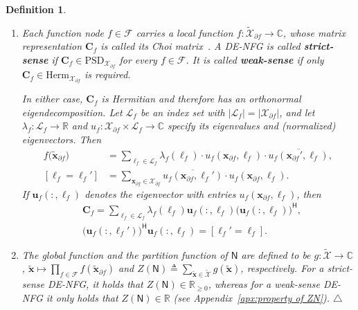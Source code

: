 \documentclass[journal]{IEEEtran}
\newcommand{\add}[1]{{\color{black}#1}}
\newtheorem{definition}[theorem]{Definition}
\newcommand{\manualendsymbol}[1]{%
  \leavevmode\unskip\penalty9999\hbox{}\nobreak\hfill
  \quad\hbox{#1}}
\newcommand{\edefinition}{\manualendsymbol{\ensuremath{\triangle}}}
\newcommand{\vect}[1]{ \bm{#1} }
\newcommand{\set}[1]{\mathcal{#1}}
\newcommand{\setF}{ \mathcal{F} }
\newcommand{\setpf}{ \partial f }
\newcommand{\sR}{\mathbb{R}}
\newcommand{\sC}{\mathbb{C}}
\newcommand{\Herm}{\mathsf{H}}
\newcommand{\vx}{ \vect{x} }
\newcommand{\graphN}{ \mathsf{N} }
\newcommand{\defeq}{ \triangleq }
\newcommand{\setHerm}[1]{ \mathrm{Herm}_{#1} }
\newcommand{\setPSD}[1]{ \mathrm{PSD}_{#1} }
\newcommand{\sRp}{ \mathbb{R}_{\geq 0} }
\newcommand{\tset}[1]{\tilde{\mathcal{#1}}}
\newcommand{\matr}[1]{\vect{#1}}
\newcommand{\tvx}{ \tilde{\vect{x}}  }
\begin{document}
\begin{definition}
\begin{enumerate}
    \item\label{sec:DENFG:def:4:item:4} \add{Each function node
            $f\in\setF$ carries a local function $f:\tset{X}_{\setpf}\to\sC$,
            whose matrix representation $\matr{C}_f$ is called its Choi
            matrix~\cite{Wood2015}. A DE-NFG is called \textbf{strict-sense}
            if} \add{$\matr{C}_f\in\setPSD{\set{X}_{\setpf}}$ for every
            $f\in\setF$. It is called \textbf{weak-sense} if only
            $\matr{C}_f\in\setHerm{\set{X}_{\setpf}}$ is required.}

          \add{In either case, $\matr{C}_f$ is Hermitian and therefore has an
            orthonormal eigendecomposition. Let $\set{L}_f$ be an index set
            with $|\set{L}_f|=|\set{X}_{\setpf}|$, and let
            $\lambda_f:\set{L}_f\to\sR$ and
            $u_f:\set{X}_{\setpf}\times\set{L}_f\to\sC$ specify its
            eigenvalues and (normalized) eigenvectors. Then}
          \begin{align}
            \!\!\!\!\! \! f\bigl(\tvx_{\setpf}\bigr)
             & =\sum_{\ell_f\in\set{L}_f}
            \lambda_f(\ell_f)
            \cdot u_f(\vx_{\setpf},\ell_f)
            \cdot  \overline{u_f(\vx_{\setpf}',\ell_f)},
            \label{sec:DENFG:eqn:5}                    \\
            \!\!\!\!\! \!  [\ell_f=\ell_f']
             & =\sum_{\vx_{\setpf}\in\set{X}_{\setpf}}
            \overline{u_f(\vx_{\setpf},\ell_f')}
            \cdot  u_f(\vx_{\setpf},\ell_f).
            \label{sec:DENFG:eqn:8}
          \end{align}
          \add{If $\vect{u}_f(:,\ell_f)$ denotes the eigenvector with entries
            $u_f(\vx_{\setpf},\ell_f)$, then}
          \begin{align}
             & \matr{C}_f
            =\sum_{\ell_f\in\set{L}_f}
            \lambda_f(\ell_f)
            \vect{u}_f(:,\ell_f)
            \bigl(\vect{u}_f(:,\ell_f)\bigr)^{\!\Herm},
            \label{sec:DENFG:eqn:9}                        \\
             & \bigl(\vect{u}_f(:,\ell_f')\bigr)^{\!\Herm}
            \vect{u}_f(:,\ell_f)
            =[\ell_f'=\ell_f].
            \nonumber
          \end{align}

    \item \add{The global function and the partition function of $\graphN$
            are defined to be $g:\tset{X}\to\sC$,
            $\tvx\mapsto\prod_{f\in\setF}f(\tvx_{\setpf})$ and
            $Z(\graphN)\defeq\sum_{\tvx\in\tset{X}}g(\tvx)$, respectively. For
            a strict-sense DE-NFG, it holds that $Z(\graphN)\in\sRp$, whereas
            for a weak-sense DE-NFG it only holds that $Z(\graphN)\in\sR$ (see
            Appendix~\ref{apx:property of ZN}).}  \edefinition

  \end{enumerate}
\end{definition}
\end{document}
